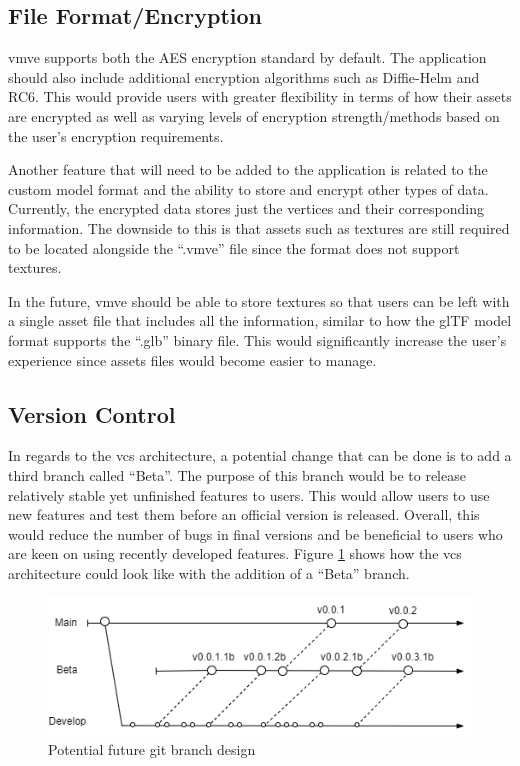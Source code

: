 \documentclass[11pt]{article}
\begin{document}
\subsection{File Format/Encryption}
\gls*{vmve} supports both the AES encryption standard by default. The application
should also include additional encryption algorithms such as Diffie-Helm and
RC6. This would provide users with greater flexibility in terms of how their
assets are encrypted as well as varying levels of encryption strength/methods
based on the user's encryption requirements.

Another feature that will need to be added to the application is related to the
custom model format and the ability to store and encrypt other types of data.
Currently, the encrypted data stores just the vertices and their corresponding
information. The downside to this is that assets such as textures are still
required to be located alongside the ``.vmve'' file since the format does not
support textures.

In the future, \gls*{vmve} should be able to store textures so that users can be
left with a single asset file that includes all the information, similar to how
the glTF model format supports the ``.glb'' binary file. This would
significantly increase the user's experience since assets files would become
easier to manage.

\subsection{Version Control}
In regards to the \gls*{vcs} architecture, a potential change that can be done is
to add a third branch called ``Beta''. The purpose of this branch would be to
release relatively stable yet unfinished features to users. This would allow
users to use new features and test them before an official version is released.
Overall, this would reduce the number of bugs in final versions and be
beneficial to users who are keen on using recently developed features. Figure
\ref{fig:futurebrancharch} shows how the \gls*{vcs} architecture could look like
with the addition of a ``Beta'' branch.

\begin{figure}[H]
  \centering
  \includegraphics[width=\textwidth]{images/future_branch_design.png}
  \caption{Potential future git branch design}
  \label{fig:futurebrancharch}
\end{figure}
\end{document}
